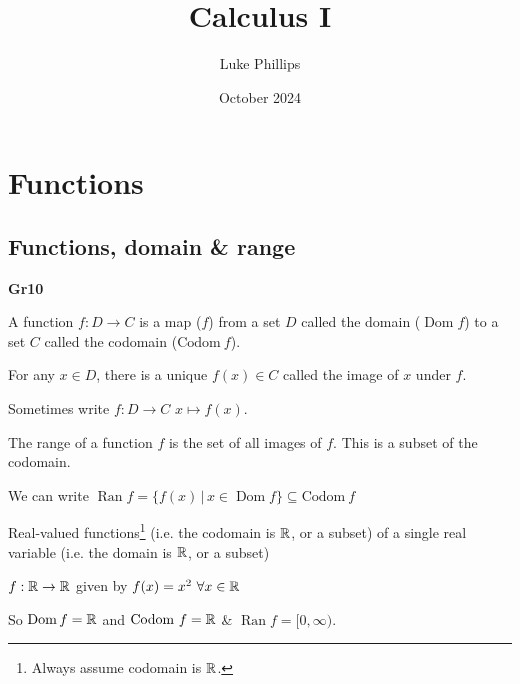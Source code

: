 \documentclass[10pt, a4paper]{article}
\title{Calculus I}
\author{Luke Phillips}
\date{October 2024}
\DeclareMathOperator{\Dom}{Dom}
\DeclareMathOperator{\Ran}{Ran}
\begin{document}
\maketitle

\newpage

\section{Functions}

\subsection{Functions, domain \& range}

\textbf{Gr10}

\begin{definition}
    A function $f : D \rightarrow C$ is a map ($f$) from a set $D$ called the domain ($\Dom f$) to a set $C$ called the codomain ($\mathrm{Codom}\ f$).
    
    For any $x \in D$, there is a unique $f(x) \in C$ called the image of $x$ under $f$.
\end{definition}

Sometimes  write $f : D \rightarrow C$ $x \mapsto f(x)$.

\begin{definition}
    The range of a function $f$ is the set of all images of $f$. This is a subset of the codomain.
    
    We can write $\Ran f = \{f(x)\,|\,x \in \Dom f\} \subseteq \mathrm{Codom}\ f$
\end{definition}

Real-valued functions\footnote{Always assume codomain is $\mathbb{R}$.} (i.e. the codomain is $\mathbb{R}$, or a subset) of a single real variable (i.e. the domain is $\mathbb{R}$, or a subset)

\begin{example}
    $f : \mathbb{R} \rightarrow \mathbb{R}$ given by $f(x) = x ^ 2\ \forall x \in \mathbb{R}$

    So $\Dom f = \R$ and $\mathrm{Codom}\ f = \mathbb{R}$ \& $\Ran f = [0, \infty)$.
\end{example}
\end{document}
